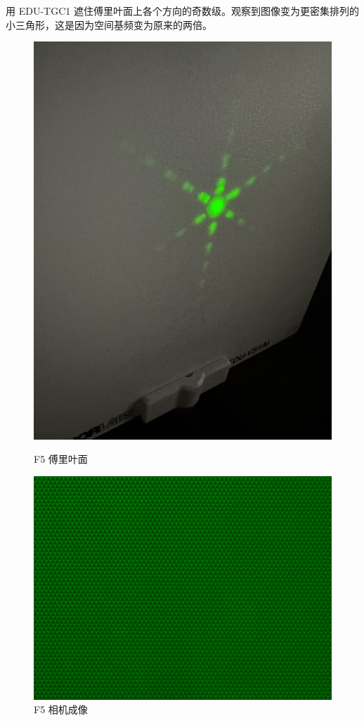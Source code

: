\documentclass{ctexart}
\begin{document}
用 EDU-TGC1 遮住傅里叶面上各个方向的奇数级。观察到图像变为更密集排列的小三角形，这是因为空间基频变为原来的两倍。
\begin{figure}[H]
  \centering
  \begin{minipage}[b]{0.2\textwidth}
    \centering
    \includegraphics[width=\textwidth]{pictures/微信图片_20241017164858.jpg}
    \caption{F5 傅里叶面}
  \end{minipage}
  \hspace{0.1\textwidth} %
  \begin{minipage}[b]{0.3\textwidth}
    \centering
    \includegraphics[width=\textwidth]{pictures/F5-mask-Ex21.png}
    \caption{F5 相机成像}
  \end{minipage}
\end{figure}
\end{document}
